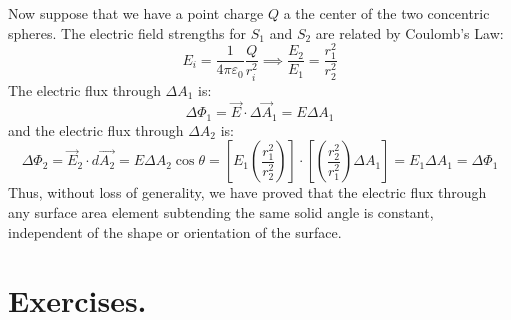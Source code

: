 \documentclass[11pt, letterpaper]{article}
\begin{document}
	Now suppose that we have a point charge $Q$ a the center of the two concentric spheres.
	The electric field strengths for $S_1$ and $S_2$ are related by Coulomb's Law:
	\[E_i = \frac{1}{4\pi\varepsilon_0}\frac{Q}{r_i^2} \implies \frac{E_2}{E_1} = \frac{r_1^2}{r_2^2}\]
	The electric flux through $\Delta A_1$ is:\[\Delta \Phi_1 = \vec{E}\cdot\Delta \vec{A}_1 = 
	E\Delta A_1\] and the electric flux through $\Delta A_2$ is:\[\Delta\Phi_2 = \vec{E}_2
	\cdot d\vec{A_2} = E\Delta A_2\cos\theta = \left[E_1\left(\frac{r_1^2}{r_2^2}\right)\right]\cdot\left[
	\left(\frac{r_2^2}{r_1^2}\right)\Delta A_1\right] = E_1\Delta A_1 =\Delta\Phi_1\] Thus, without loss
	of generality, we have proved that the electric flux through any surface area element subtending
	the same solid angle is constant, independent of the shape or orientation of the surface.
	
	
	\section{Exercises.}
\end{document}
